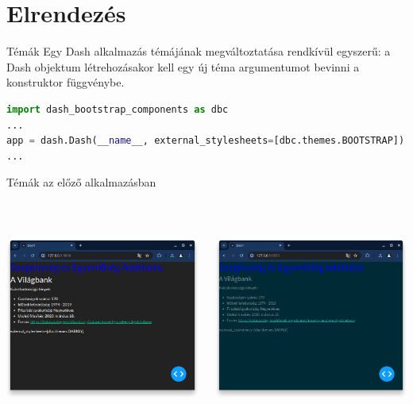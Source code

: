 \documentclass[english, aspectratio=169]{beamer}
\makeatletter
\let\origtableofcontents=\tableofcontents
\def\tableofcontents{\@ifnextchar[{\origtableofcontents}{\gobbletableofcontents}}
\def\gobbletableofcontents#1{\origtableofcontents}
\makeatother
\begin{document}
\section{Elrendezés}

\begin{frame}{}
	\tableofcontents[currentsection]
\end{frame}

\begin{frame}[fragile]{Témák}
Egy Dash alkalmazás témájának megváltoztatása rendkívül egyszerű: a Dash objektum létrehozásakor kell egy új téma argumentumot bevinni a konstruktor függvénybe.\par\medskip
\begin{lstlisting}[language=python]
import dash_bootstrap_components as dbc
...
app = dash.Dash(__name__, external_stylesheets=[dbc.themes.BOOTSTRAP])
...
\end{lstlisting}
\end{frame}

\begin{frame}{Témák az előző alkalmazásban}
	\begin{columns}
		\begin{column}{.5\textwidth}
			\begin{center}
				\includegraphics[width=7cm, height=7cm, keepaspectratio]{images/dash_7.png}
			\end{center}
		\end{column}
		\begin{column}{.5\textwidth}
			\begin{center}
				\includegraphics[width=7cm, height=7cm, keepaspectratio]{images/dash_8.png}
			\end{center}
		\end{column}
	\end{columns}
\end{frame}
\end{document}
